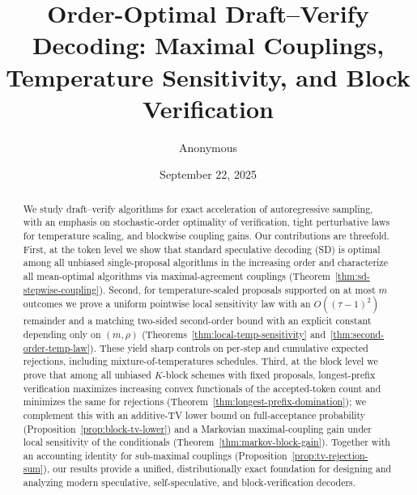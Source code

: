 \documentclass[11pt]{article}
\title{Order-Optimal Draft--Verify Decoding: Maximal Couplings, Temperature Sensitivity, and Block Verification}
\author{Anonymous}
\date{September 22, 2025}
\numberwithin{equation}{section}
\theoremstyle{plain}
\theoremstyle{definition}
\theoremstyle{remark}
\begin{document}
\maketitle

\begin{abstract}
We study draft--verify algorithms for exact acceleration of autoregressive sampling, with an emphasis on stochastic-order optimality of verification, tight perturbative laws for temperature scaling, and blockwise coupling gains. Our contributions are threefold. First, at the token level we show that standard speculative decoding (SD) is optimal among all unbiased single-proposal algorithms in the increasing order and characterize all mean-optimal algorithms via maximal-agreement couplings (Theorem~\ref{thm:sd-stepwise-coupling}). Second, for temperature-scaled proposals supported on at most $m$ outcomes we prove a uniform pointwise local sensitivity law with an $O((\tau-1)^2)$ remainder and a matching two-sided second-order bound with an explicit constant depending only on $(m,\rho)$ (Theorems~\ref{thm:local-temp-sensitivity} and~\ref{thm:second-order-temp-law}). These yield sharp controls on per-step and cumulative expected rejections, including mixture-of-temperatures schedules. Third, at the block level we prove that among all unbiased $K$-block schemes with fixed proposals, longest-prefix verification maximizes increasing convex functionals of the accepted-token count and minimizes the same for rejections (Theorem~\ref{thm:longest-prefix-domination}); we complement this with an additive-TV lower bound on full-acceptance probability (Proposition~\ref{prop:block-tv-lower}) and a Markovian maximal-coupling gain under local sensitivity of the conditionals (Theorem~\ref{thm:markov-block-gain}). Together with an accounting identity for sub-maximal couplings (Proposition~\ref{prop:tv-rejection-sum}), our results provide a unified, distributionally exact foundation for designing and analyzing modern speculative, self-speculative, and block-verification decoders.
\end{abstract}
\end{document}
